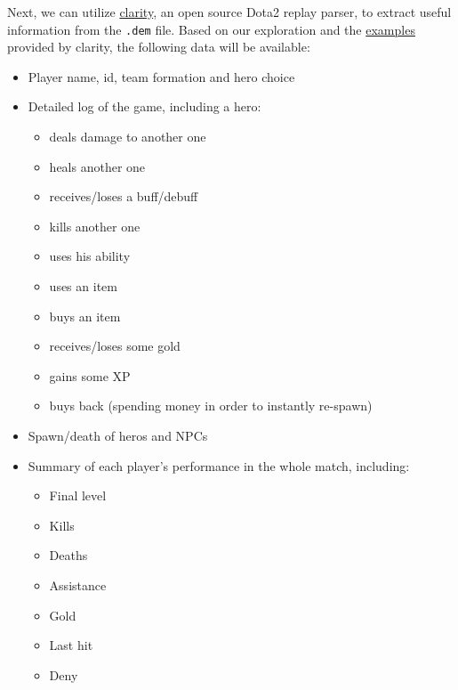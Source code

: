 \documentclass{article}
\newcommand{\codeinline}[1]{
	\texttt{#1}
}
\begin{document}
Next, we can utilize \href{https://github.com/skadistats/clarity}{clarity},
an open source Dota2 replay parser, to extract useful information from the \codeinline{.dem} file.
Based on our exploration and the \href{https://github.com/skadistats/clarity-examples}{examples}
provided by clarity, the following data will be available:

\begin{itemize}
	\item Player name, id, team formation and hero choice
	\item Detailed log of the game, including a hero:
	\begin{itemize}
		\item deals damage to another one
		\item heals another one
		\item receives/loses a buff/debuff
		\item kills another one
		\item uses his ability
		\item uses an item
		\item buys an item
		\item receives/loses some gold
		\item gains some XP
		\item buys back (spending money in order to instantly re-spawn)
	\end{itemize}
	\item Spawn/death of heros and NPCs
	\item Summary of each player's performance in the whole match, including:
	\begin{itemize}
		\item Final level
		\item Kills
		\item Deaths
		\item Assistance
		\item Gold
		\item Last hit
		\item Deny
	\end{itemize}
\end{itemize}



\end{document}
